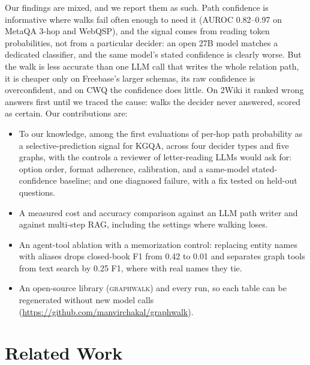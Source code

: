 \documentclass[11pt]{article}
\newcommand{\sys}{\textsc{graphwalk}}
\begin{document}
Our findings are mixed, and we report them as such. Path confidence is informative
where walks fail often enough to need it (AUROC 0.82--0.97 on MetaQA 3-hop and WebQSP),
and the signal comes from reading token probabilities, not from a particular decider: an
open 27B model matches a dedicated classifier, and the same model's stated confidence is
clearly worse. But the walk is less accurate than one LLM call that writes the whole
relation path, it is cheaper only on Freebase's larger schemas, its raw confidence is
overconfident, and on CWQ the confidence does little. On 2Wiki it ranked wrong answers
first until we traced the cause: walks the decider never answered, scored as certain. Our
contributions are:
\begin{itemize}
\setlength\itemsep{0pt}
\item To our knowledge, among the first evaluations of per-hop path probability as a
  selective-prediction signal for KGQA, across four decider types and five graphs, with
  the controls a reviewer of letter-reading LLMs would ask for: option order, format
  adherence, calibration, and a same-model stated-confidence baseline; and one diagnosed
  failure, with a fix tested on held-out questions.
\item A measured cost and accuracy comparison against an LLM path writer and against
  multi-step RAG, including the settings where walking loses.
\item An agent-tool ablation with a memorization control: replacing entity names with
  aliases drops closed-book F1 from 0.42 to 0.01 and separates graph tools from text
  search by 0.25 F1, where with real names they tie.
\item An open-source library (\sys{}) and every run, so each table can be regenerated
  without new model calls (\url{https://github.com/manvirchakal/graphwalk}).
\end{itemize}

\section{Related Work}
\end{document}

